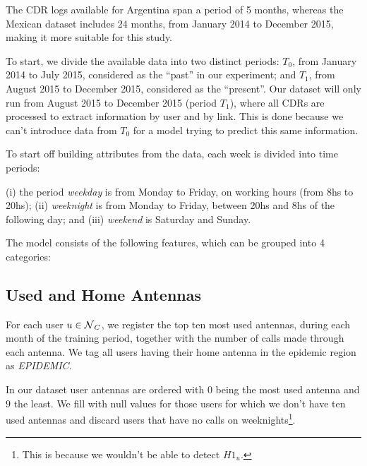 The CDR logs available for Argentina span a period of 5 months,
whereas the Mexican dataset includes 24 months, from January 2014 to December 2015, making it more suitable for this study.

To start, we divide the available data into two distinct periods:
$T_0$, from January 2014 to July 2015, considered as the ``past'' in our experiment;
and $T_1$, from August 2015 to December 2015, considered as the ``present''.
Our dataset will only run from August 2015 to December 2015 (period $T_1$), where all CDRs are processed to extract information by user and by link.
This is done because we can't introduce data from $T_0$ for a model trying to predict this same information.

To start off building attributes from the data, each week is divided into time periods:
\begin{definition}\label{def:week-periods}
	(i) the period \textit{weekday} is from Monday to Friday, on working hours (from 8hs to 20hs); (ii) \textit{weeknight} is from Monday to Friday, between 20hs and 8hs of the following day;
	and (iii) \textit{weekend} is Saturday and Sunday.
\end{definition}

The model consists of the following features, which can be grouped into 4 categories:

\subsection{Used and Home Antennas}\label{homeantenna}

For each user $u \in \operatorname{\mathcal{N}}_C$, we register the top ten most used antennas, during each month of the training period,
together with the number of calls made through each antenna.
We tag all users having their home antenna in the epidemic region as \textit{EPIDEMIC}.

In our dataset user antennas are ordered with $0$ being the most used antenna and $9$ the least.
We fill with null values for those users for which we don't have ten used antennas and discard users that have no calls on weeknights\footnote{This is because we wouldn't be able to detect $H1_u$.}.


